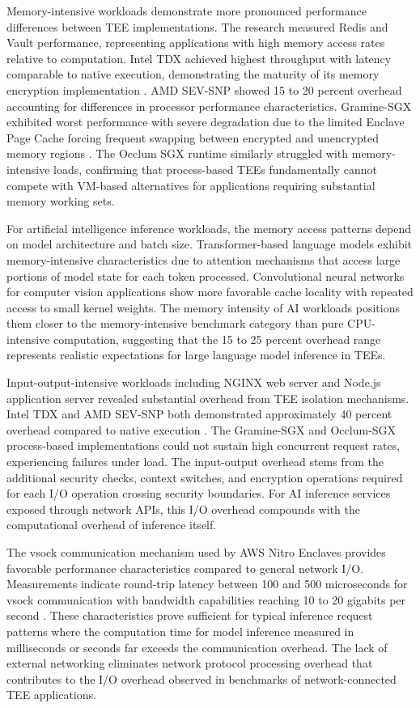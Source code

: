 Memory-intensive workloads demonstrate more pronounced performance differences between TEE implementations. The research measured Redis and Vault performance, representing applications with high memory access rates relative to computation. Intel TDX achieved highest throughput with latency comparable to native execution, demonstrating the maturity of its memory encryption implementation \cite{tee_evolution}. AMD SEV-SNP showed 15 to 20 percent overhead accounting for differences in processor performance characteristics. Gramine-SGX exhibited worst performance with severe degradation due to the limited Enclave Page Cache forcing frequent swapping between encrypted and unencrypted memory regions \cite{gramine}. The Occlum SGX runtime similarly struggled with memory-intensive loads, confirming that process-based TEEs fundamentally cannot compete with VM-based alternatives for applications requiring substantial memory working sets.

For artificial intelligence inference workloads, the memory access patterns depend on model architecture and batch size. Transformer-based language models exhibit memory-intensive characteristics due to attention mechanisms that access large portions of model state for each token processed. Convolutional neural networks for computer vision applications show more favorable cache locality with repeated access to small kernel weights. The memory intensity of AI workloads positions them closer to the memory-intensive benchmark category than pure CPU-intensive computation, suggesting that the 15 to 25 percent overhead range represents realistic expectations for large language model inference in TEEs.

Input-output-intensive workloads including NGINX web server and Node.js application server revealed substantial overhead from TEE isolation mechanisms. Intel TDX and AMD SEV-SNP both demonstrated approximately 40 percent overhead compared to native execution \cite{tee_evolution}. The Gramine-SGX and Occlum-SGX process-based implementations could not sustain high concurrent request rates, experiencing failures under load. The input-output overhead stems from the additional security checks, context switches, and encryption operations required for each I/O operation crossing security boundaries. For AI inference services exposed through network APIs, this I/O overhead compounds with the computational overhead of inference itself.

The vsock communication mechanism used by AWS Nitro Enclaves provides favorable performance characteristics compared to general network I/O. Measurements indicate round-trip latency between 100 and 500 microseconds for vsock communication with bandwidth capabilities reaching 10 to 20 gigabits per second \cite{nitro_security}. These characteristics prove sufficient for typical inference request patterns where the computation time for model inference measured in milliseconds or seconds far exceeds the communication overhead. The lack of external networking eliminates network protocol processing overhead that contributes to the I/O overhead observed in benchmarks of network-connected TEE applications.

